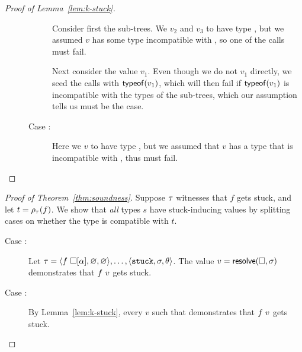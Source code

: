 \begin{proof}[Proof of Lemma~\ref{lem:k-stuck}]
\begin{description}
\begin{description}
      Consider first the sub-trees. We \forcesym $v_2$ and $v_3$ to have
      type , but we assumed $v$ has some type incompatible with
      , so one of the \forcesym calls must fail.

      Next consider the value $v_1$. Even though we do not \forcesym
      $v_1$ directly, we seed the \forcesym calls with $\mathsf{typeof}(v_1)$,
      which will then fail if $\mathsf{typeof}(v_1)$ is incompatible with the
      types of the sub-trees, which our assumption tells us must be the
      case.
    \item[Case \rulename{E-Case-Good\{1,2\}}:] Here we \forcesym $v$ to
      have type \ttree{\thole}, but we assumed that $v$ has a type that
      is incompatible with \ttree{\thole}, thus \forcesym must fail.
    \end{description}
  \end{description}
\end{proof}

\begin{proof}[Proof of Theorem~\ref{thm:soundness}]
Suppose $\tau$ witnesses that $f$ gets stuck,
and let $t = \rho_{\tau}(f)$.
We show that \emph{all} types $s$ have stuck-inducing
values by splitting cases on whether the type is
compatible with $t$. %
%
\begin{description}
\item [Case :]
  Let $\tau = \langle f\ \square[\alpha], \varnothing, \varnothing \rangle,\ldots,\langle \mathtt{stuck}, \sigma, \theta \rangle$.
  The value $v = \mathsf{resolve}(\square, \sigma)$ demonstrates that
  $f\ v$ gets stuck.
\item [Case :] By Lemma~\ref{lem:k-stuck}, every $v$
  such that  demonstrates that $f\ v$ gets stuck.
\end{description}
\end{proof}
